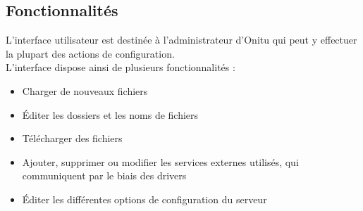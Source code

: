 \subsection{Fonctionnalités}

L'interface utilisateur est destinée à l'administrateur d'Onitu qui peut y effectuer la plupart des actions de configuration.\\

L'interface dispose ainsi de plusieurs fonctionnalités :
\begin{itemize}
\renewcommand{\labelitemi}{$\bullet$}
    \item Charger de nouveaux fichiers
    \item Éditer les dossiers et les noms de fichiers
    \item Télécharger des fichiers
    \item Ajouter, supprimer ou modifier les services externes utilisés, qui communiquent par le biais des drivers
    \item Éditer les différentes options de configuration du serveur
\end{itemize}

